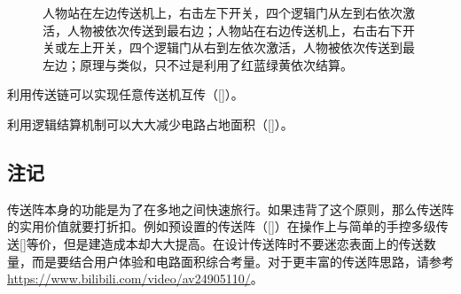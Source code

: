 \begin{figure}[!ht]
\begin{center}
\qquad
{}
\end{center}
\caption{\protect{}人物站在左边传送机上，右击左下开关，四个逻辑门从左到右依次激活，人物被依次传送到最右边；人物站在右边传送机上，右击右下开关或左上开关，四个逻辑门从右到左依次激活，人物被依次传送到最左边；\protect{}原理与\protect{}类似，只不过是利用了红蓝绿黄依次结算。}
\label{i249:252}
\end{figure}

利用传送链可以实现任意传送机互传（\autoref{}）。

利用逻辑结算机制可以大大减少电路占地面积（\autoref{}）。

\subsection{注记}
传送阵本身的功能是为了在多地之间快速旅行。如果违背了这个原则，那么传送阵的实用价值就要打折扣。例如预设置的传送阵（\autoref{}）在操作上与简单的手控多级传送\autoref{}等价，但是建造成本却大大提高。在设计传送阵时不要迷恋表面上的传送数量，而是要结合用户体验和电路面积综合考量。对于更丰富的传送阵思路，请参考\url{https://www.bilibili.com/video/av24905110/}。

